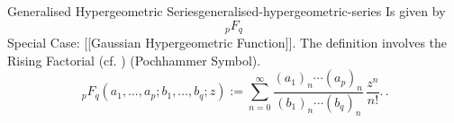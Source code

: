 \begin{definition}{Generalised Hypergeometric Series}{generalised-hypergeometric-series}
  Is given by \[_pF_q\] Special Case: {[}{[}Gaussian Hypergeometric
  Function{]}{]}. The definition involves the Rising Factorial (cf. )
  (Pochhammer Symbol).
  $${ \,{}_{p}F_{q}(a_{1},\ldots ,a_{p};b_{1},\ldots ,b_{q};z) := \sum _{n=0}^{\infty }{\frac {(a_{1})_{n}\cdots (a_{p})_{n}}{(b_{1})_{n}\cdots (b_{q})_{n}}}\,{\frac {z^{n}}{n!}}.}\,.$$
\end{definition}
